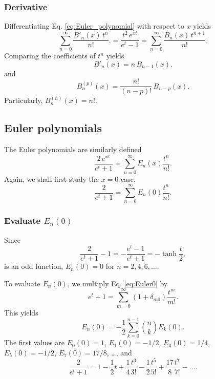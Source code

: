 \documentclass[aip,jcp,preprint,notitlepage, superscriptaddress]{revtex4-1}
\begin{document}
\subsubsection{Derivative}




Differentiating Eq. \eqref{eq:Euler_polynomial}
with respect to $x$ yields
\[
\sum_{n = 0}^\infty \frac{ B'_n(x) \, t^{n} } { n! }.
=
\frac{ t^2 \, e^{x t} }
{ e^t - 1 }
=
\sum_{n = 0}^\infty \frac{ B_n(x) \, t^{n + 1} } { n! }.
\]
Comparing the coefficients of $t^n$ yields
\[
B'_n(x)
=
n \, B_{n-1}(x).
\]
and
\begin{equation}
  B^{(p)}_n(x)
=
\frac{n!}{(n-p)!} \, B_{n-p}(x).
\label{eq:dBernoulli_polynomial}
\end{equation}
Particularly,
$B^{(n)}_n(x) = n!$.



\subsection{Euler polynomials}



The Euler polynomials are similarly defined
%
\begin{equation}
  \frac{ 2 \, e^{x t} }
  {e^t + 1}
=
\sum_{n = 0}^\infty
  E_n(x) \frac{ t^n } { n! }.
\label{eq:Euler_polynomial}
\end{equation}
%
Again, we shall first study the $x = 0$ case.
%
\begin{equation}
  \frac{ 2 }
  {e^t + 1}
=
\sum_{n = 0}^\infty
  E_n(0) \frac{ t^n } { n! }.
\label{eq:Euler0}
\end{equation}



\subsubsection{Evaluate $E_n(0)$}



Since
\[
\frac{ 2 } {e^t + 1} - 1
=
-\frac{ e^t - 1 } {e^t + 1}
=
-\tanh \frac t 2,
\]
is an odd function,
$E_{n}(0) = 0$
for $n = 2, 4, 6, \dots$.



To evaluate $E_n(0)$,
we multiply Eq. \eqref{eq:Euler0}
by
\[
e^t + 1
=
\sum_{m = 0}^\infty
  (1 + \delta_{m0}) \frac{ t^m }{ m! }.
\]
This yields
\[
E_n(0)
=
-\frac{1}{2}
\sum_{k = 0}^{n - 1}
{n \choose k} E_k(0).
\]
The first values are
$E_0(0) = 1$,
$E_1(0) = -1/2$,
$E_3(0) = 1/4$,
$E_5(0) = -1/2$,
$E_7(0) = 17/8$,
\dots,
%
and
%
\begin{equation}
\frac 2 {e^t + 1}
=
1 - \frac 1 2 t
+ \frac 1 4 \frac{ t^3 }{ 3! }
- \frac 1 2 \frac{ t^5 }{ 5! }
+ \frac{ 17 }{ 8 } \frac{ t^7 }{ 7! }
- \dots.
\label{eq:Euler0_first}
\end{equation}
\end{document}
